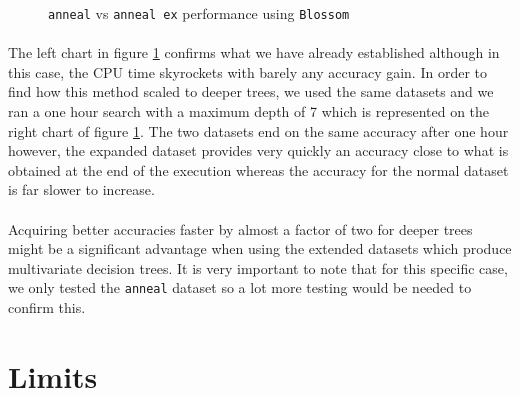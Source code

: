 \documentclass[12pt]{report}
\theoremstyle{definition}
\theoremstyle{definition}
\theoremstyle{definition}
\begin{document}
\begin{figure}[ht]
\begin{center}
    \end{center}
    \caption{\texttt{anneal} vs \texttt{anneal ex} performance using \texttt{Blossom}}
    \label{fig:annealperf}
\end{figure}

\paragraph{} The left chart in figure \ref{fig:annealperf} confirms what we have already established although in this
case, the CPU time skyrockets with barely any accuracy gain. In order to find how this method scaled to deeper trees,
we used the same datasets and we ran a one hour search with a maximum depth of 7 which is represented on the right chart
of figure \ref{fig:annealperf}. The two datasets end on the same accuracy after one hour however, the expanded dataset
provides very quickly an accuracy close to what is obtained at the end of the execution whereas the accuracy for the
normal dataset is far slower to increase.

\paragraph{} Acquiring better accuracies faster by almost a factor of two for deeper trees might be a significant
advantage when using the extended datasets which produce multivariate decision trees. It is very important to note
that for this specific case, we only tested the \texttt{anneal} dataset so a lot more testing would be needed to confirm
this.

\newpage

\section{Limits}
\end{document}
